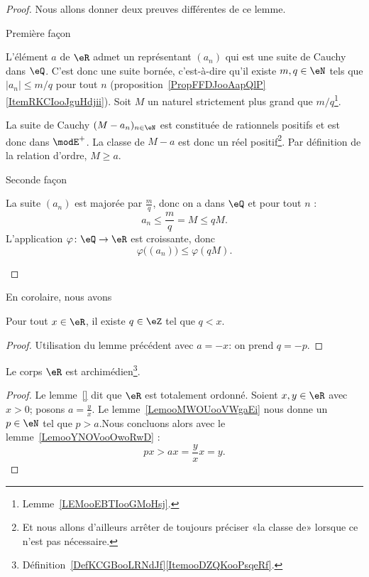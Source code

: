 \begin{proof}
    Nous allons donner deux preuves différentes de ce lemme.
    \begin{subproof}
    \item[Première façon]

        L'élément \( a\) de \( \eR\) admet un représentant \( (a_n)\) qui est une suite de Cauchy dans \( \eQ\). C'est donc une suite bornée, c'est-à-dire qu'il existe \( m,q\in \eN\) tels que \( | a_n |\leq m/q\) pour tout \( n\) (proposition~\ref{PropFFDJooAapQlP}\ref{ItemRKCIooJguHdjii}). Soit \( M\) un naturel strictement plus grand que \( m/q\)\footnote{Lemme~\ref{LEMooEBTIooGMoHsj}.}.

    La suite de Cauchy \( (M-a_n)_{n\in \eN}\) est constituée de rationnels positifs et est donc dans \( \modE^+\). La classe de \( M-a\) est donc un réel positif\footnote{Et nous allons d'ailleurs arrêter de toujours préciser «la classe de» lorsque ce n'est pas nécessaire.}. Par définition de la relation d'ordre, \( M\geq a\).
\item[Seconde façon]

    La suite \( (a_n)\) est majorée par \( \frac{ m }{ q }\), donc on a dans \( \eQ\) et pour tout \( n\) :
    \begin{equation}
        a_n\leq \frac{ m }{ q }=M\leq qM.
    \end{equation}
    L'application \( \varphi\colon \eQ\to \eR\) est croissante, donc
    \begin{equation}
        \varphi\big( (a_n) \big)\leq \varphi(qM).
    \end{equation}
    \end{subproof}
\end{proof}

En corolaire, nous avons
\begin{lemma}      \label{LEMooMWOUooVWgbFi}
    Pour tout \( x\in \eR\), il existe \( q\in \eZ\) tel que \( q < x\).
\end{lemma}
\begin{proof}
    Utilisation du lemme précédent avec \( a = -x \): on prend \( q = -p \).
\end{proof}

\begin{theorem}        \label{ThoooKJTTooCaxEny}
    Le corps \( \eR\) est archimédien\footnote{Définition~\ref{DefKCGBooLRNdJf}\ref{ItemooDZQKooPsqeRf}.}.
\end{theorem}

\begin{proof}
    Le lemme~\ref{} dit que \( \eR\) est totalement ordonné. Soient \( x,y\in \eR\) avec \( x>0\); posons \( a=\frac{ y }{ x }\). Le lemme~\ref{LemooMWOUooVWgaEi} nous donne un \( p \in \eN\) tel que \(p > a\).Nous concluons alors avec le lemme~\ref{LemooYNOVooOwoRwD} :
    \begin{equation}
        px>ax=\frac{ y }{ x }x=y.
    \end{equation}
\end{proof}

